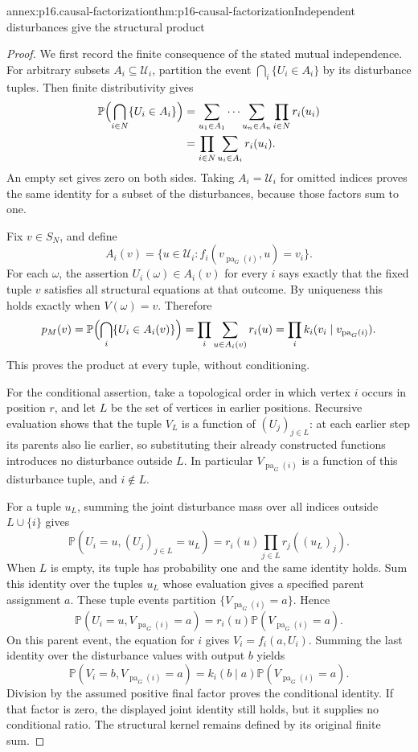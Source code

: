 \begin{annexitem}{annex:p16.causal-factorization}{thm:p16-causal-factorization}{Independent disturbances give the structural product}
\begin{proof}
We first record the finite consequence of the stated mutual independence.
For arbitrary subsets \(A_i\subseteq\mathcal U_i\), partition the
event \(\bigcap_i\{U_i\in A_i\}\) by its disturbance tuples.
Then finite distributivity gives
\[
\begin{aligned}
 \mathbb P\Bigl(\bigcap_{i\in N}\{U_i\in A_i\}\Bigr)
 &=\sum_{u_1\in A_1}\cdots\sum_{u_n\in A_n}
                         \prod_{i\in N}r_i(u_i)\\
 &=\prod_{i\in N}\sum_{u_i\in A_i}r_i(u_i).
\end{aligned}
\]
An empty set gives zero on both sides. Taking \(A_i=\mathcal U_i\)
for omitted indices proves the same identity for a subset of the
disturbances, because those factors sum to one.

Fix \(v\in S_N\), and define
\[
 A_i(v)=\{u\in\mathcal U_i:
               f_i(v_{\operatorname{pa}_G(i)},u)=v_i\}.
\]
For each \(\omega\), the assertion \(U_i(\omega)\in A_i(v)\)
for every \(i\) says exactly that the fixed tuple \(v\) satisfies
all structural equations at that outcome. By uniqueness this holds
exactly when \(V(\omega)=v\). Therefore
\[
 p_M(v)=\mathbb P\Bigl(\bigcap_i\{U_i\in A_i(v)\}\Bigr)
       =\prod_i\sum_{u\in A_i(v)}r_i(u)
       =\prod_i k_i(v_i\mid v_{\operatorname{pa}_G(i)}).
\]
This proves the product at every tuple, without conditioning.

For the conditional assertion, take a topological order in which vertex
\(i\) occurs in position \(r\), and let \(L\) be the set of
vertices in earlier positions. Recursive evaluation shows that the tuple
\(V_L\) is a function of \((U_j)_{j\in L}\): at each earlier
step its parents also lie earlier, so substituting their already
constructed functions introduces no disturbance outside \(L\).
In particular \(V_{\operatorname{pa}_G(i)}\) is a function of
this disturbance tuple, and \(i\notin L\).

For a tuple \(u_L\), summing the joint disturbance mass over all
indices outside \(L\cup\{i\}\) gives
\[
 \mathbb P(U_i=u,(U_j)_{j\in L}=u_L)
       =r_i(u)\prod_{j\in L}r_j((u_L)_j).
\]
When \(L\) is empty, its tuple has probability one and the same
identity holds. Sum this identity over the tuples \(u_L\) whose
evaluation gives a specified parent assignment \(a\). These tuple
events partition \(\{V_{\operatorname{pa}_G(i)}=a\}\). Hence
\[
 \mathbb P(U_i=u,V_{\operatorname{pa}_G(i)}=a)
       =r_i(u)\mathbb P(V_{\operatorname{pa}_G(i)}=a).
\]
On this parent event, the equation for \(i\) gives
\(V_i=f_i(a,U_i)\). Summing the last identity over the disturbance
values with output \(b\) yields
\[
 \mathbb P(V_i=b,V_{\operatorname{pa}_G(i)}=a)
       =k_i(b\mid a)\mathbb P(V_{\operatorname{pa}_G(i)}=a).
\]
Division by the assumed positive final factor proves the conditional
identity. If that factor is zero, the displayed joint identity still
holds, but it supplies no conditional ratio. The structural kernel
remains defined by its original finite sum.
\end{proof}
\end{annexitem}

